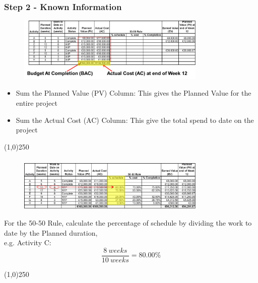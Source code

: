 \begin{frame}
\frametitle{Step 2 - Known Information}

\begin{figure}
	\centering
		\includegraphics[width = 9cm]{images/evmstep2.jpg}
	\label{fig:evmstep2}
\end{figure}
\begin{itemize}
	\item Sum the Planned Value (PV) Column: This gives the Planned Value for the entire project
	\item Sum the Actual Cost (AC) Column: This give the total spend to date on the project
\end{itemize}
\end{frame}
\begin{center}\line(1,0){250}\end{center}






\begin{frame}
\frametitle{}
\begin{figure}
	\centering
		\includegraphics[width = 9cm]{images/evmstep3.jpg}
	\label{fig:evmstep3}
\end{figure}
For the 50-50 Rule, calculate the percentage of schedule by dividing the work to date by the Planned duration,\\ e.g. Activity C:
\[
\frac{8 \: weeks}{10 \: weeks} = 80.00\% 
\] 
\end{frame}
\begin{center}\line(1,0){250}\end{center}






